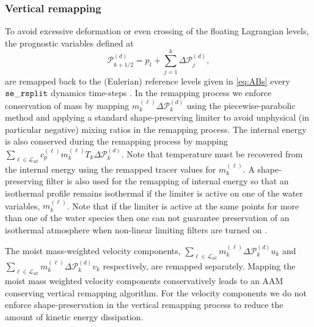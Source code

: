 \documentclass{agujournal}
\begin{document}
{\subsubsection{Vertical remapping}\label{sec:verticalRemappin}
To avoid excessive deformation or even crossing of the floating Lagrangian levels, the prognostic variables defined at
\begin{equation}
\mathcal{P}^{(d)}_{k+1/2}=p_t+\sum_{j=1}^{k}\Delta \mathcal{P}^{(d)}_j,
\end{equation}
are remapped back to the (Eulerian) reference levels given in \eqref{eq:ABs} every ${\tt{se\_rsplit}}$ dynamics time-steps \citep{L2004MWR}. In the remapping process we enforce conservation of mass by mapping $m^{(\ell)}_k\Delta \mathcal{P}^{(d)}_k$ using the piecewise-parabolic method \cite[PPM; ][]{CW1984JCP} and applying a standard shape-preserving limiter to avoid unphysical (in particular negative) mixing ratios in the remapping process. The internal energy is also conserved during the remapping process by mapping $\sum_{\ell \in \mathcal{L}_{all}} c_p^{(\ell)} m_k^{(\ell)}T_k \Delta \mathcal{P}^{(d)}_k$. Note that temperature must be recovered from the internal energy using the remapped tracer values for $m^{(\ell)}_k$. A shape-preserving filter is also used for the remapping of internal energy so that an isothermal profile remains isothermal if the limiter is active on one of the water variables, $m^{(\ell)}_k$. Note that if the limiter is active at the same points for more than one of the water species then one can not guarantee preservation of an isothermal atmosphere when non-linear limiting filters are turned on \citep[see, e.g., Section 2.5 in ][]{LT2011QJR}.

The moist mass-weighted velocity components, $\sum_{\ell \in \mathcal{L}_{all}} m^{(\ell)}_k \Delta \mathcal{P}^{(d)}_k u_k$ and $\sum_{\ell \in \mathcal{L}_{all}} m_k^{(\ell)} \Delta \mathcal{P}^{(d)}_k v_k$ respectively, are remapped separately. Mapping the moist mass weighted velocity components conservatively leads to an AAM conserving vertical remapping algorithm. For the velocity components we do not enforce shape-preservation in the vertical remapping process to reduce the amount of kinetic energy dissipation.
}
\end{document}
